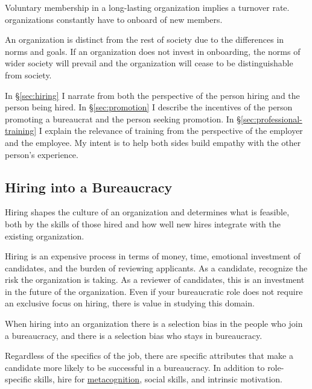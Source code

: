 
Voluntary membership in a long-lasting organization implies a turnover rate. organizations constantly have to onboard of new members.

An organization is distinct from the rest of society due to the differences in norms and goals. If an organization does not invest in onboarding, the norms of wider society will prevail and the organization will cease to be distinguishable from society.

In \S\ref{sec:hiring} I narrate from both the perspective of the person hiring and the person being hired. In \S\ref{sec:promotion} I describe the incentives of the person promoting a bureaucrat and the person seeking promotion. In \S\ref{sec:professional-training} I explain the relevance of training from the perspective of the employer and the employee. My intent is to help both sides build empathy with the other person's experience. 


\subsection{Hiring into a Bureaucracy\label{sec:hiring}}


Hiring shapes the culture of an organization and determines what is feasible, both by the skills of those hired and how well new hires integrate with the existing organization. 

Hiring is an expensive process in terms of money, time, emotional investment of candidates, and the burden of reviewing applicants. 
As a candidate, recognize the risk the organization is taking. 
As a reviewer of candidates, this is an investment in the future of the organization. Even if your bureaucratic role does not require an exclusive focus on hiring, there is value in studying this domain. 

When hiring into an organization there is a selection bias in the people who join a bureaucracy, and there is a selection bias who stays in bureaucracy. 


Regardless of the specifics of the job, there are specific attributes that make a candidate more likely to be successful in a bureaucracy. In addition to role-specific skills, hire for \href{https://en.wikipedia.org/wiki/Metacognition}{metacognition}, social skills, and intrinsic motivation.




